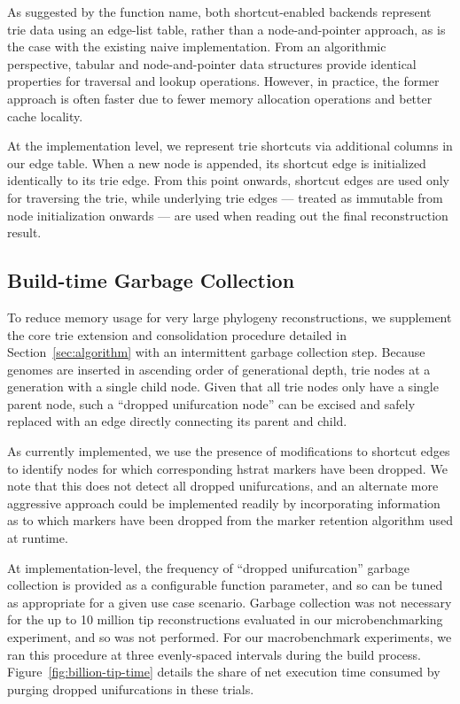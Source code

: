 As suggested by the function name, both shortcut-enabled backends represent trie data using an edge-list table, rather than a node-and-pointer approach, as is the case with the existing naive implementation.
From an algorithmic perspective, tabular and node-and-pointer data structures provide identical properties for traversal and lookup operations.
However, in practice, the former approach is often faster due to fewer memory allocation operations and better cache locality.

At the implementation level, we represent trie shortcuts via additional columns in our edge table.
When a new node is appended, its shortcut edge is initialized identically to its trie edge.
From this point onwards, shortcut edges are used only for traversing the trie, while underlying trie edges --- treated as immutable from node initialization onwards --- are used when reading out the final reconstruction result.

\subsection{Build-time Garbage Collection}

To reduce memory usage for very large phylogeny reconstructions, we supplement the core trie extension and consolidation procedure detailed in Section~\ref{sec:algorithm} with an intermittent garbage collection step.
Because genomes are inserted in ascending order of generational depth, trie nodes at a generation with a single child node.
Given that all trie nodes only have a single parent node, such a ``dropped unifurcation node'' can be excised and safely replaced with an edge directly connecting its parent and child.

As currently implemented, we use the presence of modifications to shortcut edges to identify nodes for which corresponding hstrat markers have been dropped.
We note that this does not detect all dropped unifurcations, and an alternate more aggressive approach could be implemented readily by incorporating information as to which markers have been dropped from the marker retention algorithm used at runtime.

At implementation-level, the frequency of ``dropped unifurcation'' garbage collection is provided as a configurable function parameter, and so can be tuned as appropriate for a given use case scenario.
Garbage collection was not necessary for the up to 10 million tip reconstructions evaluated in our microbenchmarking experiment, and so was not performed.
For our macrobenchmark experiments, we ran this procedure at three evenly-spaced intervals during the build process.
Figure~\ref{fig:billion-tip-time} details the share of net execution time consumed by purging dropped unifurcations in these trials.


